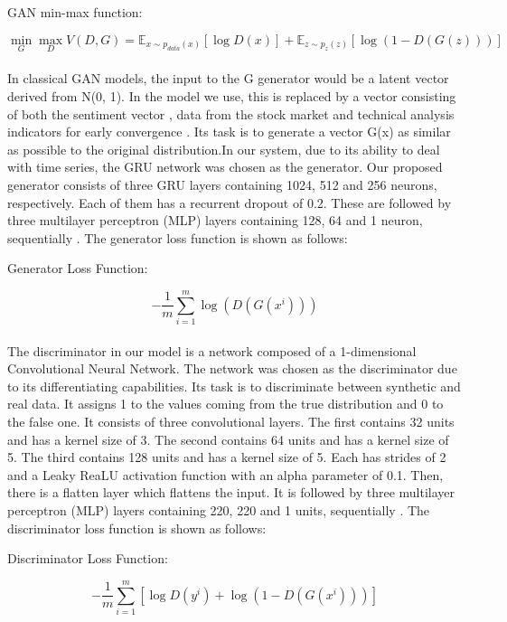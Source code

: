 \documentclass[11pt]{article} %
\begin{document}
\begin{center}   GAN min-max function: \end{center}
\begin{equation} \min_G \max_D V(D, G)=
\mathbb{E}_{x\sim p_{data}(x)}[\log D(x)]
+ \mathbb{E}_{z\sim p_z(z)}[\log(1 - D(G(z)))] \end{equation}
\\
In classical GAN models, the input to the G generator would be a latent vector derived from N(0, 1). In the model we use, this is replaced by a vector consisting of both the sentiment vector \cite{gan-stock}, data from the stock market and technical analysis indicators for early convergence \cite{gan-stock2}. Its task is to generate a vector G(x) as similar as possible to the original distribution.In our system, due to its ability to deal with time series, the GRU network was chosen as the generator. Our proposed generator consists of three GRU layers containing 1024, 512 and 256 neurons, respectively. Each of them has a recurrent dropout of 0.2. These are followed by three multilayer perceptron (MLP) layers containing 128, 64 and 1 neuron, sequentially \cite{gan-stock}\cite{gan-stock2}. 
The generator loss function is shown as follows: 

\begin{center}   Generator Loss Function:  \end{center}
\begin{equation}
-\frac{1}{m} \sum_{i=1}^{m} \log \left(D\left(G\left(x^{i}\right)\right)\right)
\end{equation}
\\
The discriminator in our model is a network composed of a 1-dimensional Convolutional Neural Network. The network was chosen as the discriminator due to its differentiating capabilities. 
 Its task is to discriminate between synthetic and real data. It assigns 1 to the values coming from the true distribution and 0 to the false one. It consists of three convolutional layers. The first contains 32 units and has a kernel size of 3. The second contains 64 units and has a kernel size of 5. The third contains 128 units and has a kernel size of 5. Each has strides of 2 and a Leaky ReaLU activation function with an alpha parameter of 0.1. Then, there is a flatten layer which flattens the input. It is followed by three multilayer perceptron (MLP) layers containing 220, 220 and 1 units, sequentially \cite{gan-stock}\cite{gan-stock2}. 
The discriminator loss function is shown as follows: 
\begin{center}  Discriminator Loss Function: \end{center}
\begin{equation}
-\frac{1}{m} \sum_{i=1}^{m}\left[\log D\left(y^{i}\right)+\log \left(1-D\left(G\left(x^{i}\right)\right)\right)\right]
\end{equation}
\end{document}
